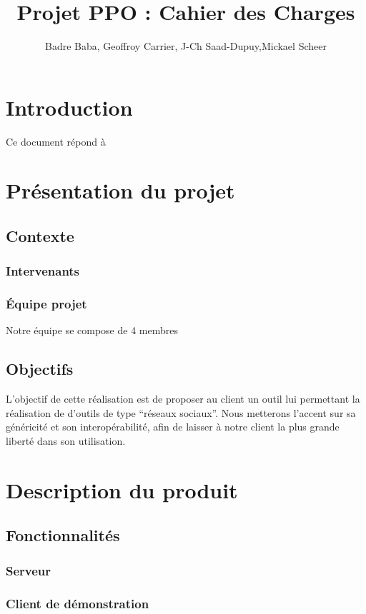 \documentclass[10pt,a4paper]{article}
\title{Projet PPO : Cahier des Charges}
\author{
	Badre Baba, Geoffroy Carrier, J-Ch Saad-Dupuy,Mickael Scheer
}
\begin{document}
\maketitle

\section{Introduction}

Ce document répond à 
\section{Présentation du projet}
 \subsection{Contexte}
  \subsubsection{Intervenants}
  \subsubsection{Équipe projet}
Notre équipe se compose de 4 membres
  \subsection{Objectifs}
L'objectif de cette réalisation est de proposer au client un outil lui permettant la réalisation de d'outils de type ``réseaux sociaux''.
Nous metterons l'accent sur sa généricité et son interopérabilité, afin de laisser à notre client la plus grande liberté dans son utilisation.

\section{Description du produit}
 \subsection{Fonctionnalités}
  \subsubsection{Serveur}
  \subsubsection{Client de démonstration}
\end{document}
